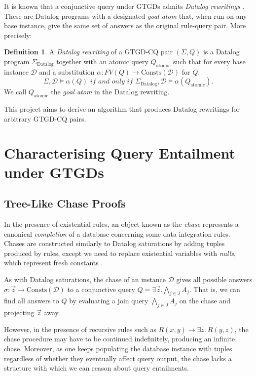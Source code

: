\documentclass[12pt]{report}
\theoremstyle{plain}
\theoremstyle{definition}
\newtheorem{definition}[theorem]{Definition}
\def\Consts{{\mathrm{Consts}}}
\begin{document}
It is known that a conjunctive query under GTGDs admits \emph{Datalog rewritings} \cite{barany_benedikt_cate_2013}. These are Datalog programs with a designated \emph{goal atom} that, when run on any base instance, give the same set of answers as the original rule-query pair. More precisely:

\begin{definition}
  A \emph{Datalog rewriting} of a GTGD-CQ pair $(\Sigma, Q)$ is a Datalog program $\Sigma_\mathrm{Datalog}$ together with an atomic query $Q_\mathrm{atomic}$ such that for every base instance $\mathcal{D}$ and a substitution $\alpha: FV(Q) \rightarrow \Consts(\mathcal{D})$ for $Q$, $$\Sigma, \mathcal{D} \models \alpha(Q) \textit{ if and only if } \Sigma_\mathrm{Datalog}, \mathcal{D} \models \alpha(Q_\mathrm{atomic}).$$
  We call $Q_\mathrm{atomic}$ the \emph{goal atom} in the Datalog rewriting.
\end{definition}

This project aims to derive an algorithm that produces Datalog rewritings for arbitrary GTGD-CQ pairs.

\newpage
\chapter{Characterising Query Entailment under GTGDs}
\label{characterising-query-entailment-under-gtgds}

\section{Tree-Like Chase Proofs}

In the presence of existential rules, an object known as the \emph{chase} represents a canonical \emph{completion} of a database concerning some data integration rules. Chases are constructed similarly to Datalog saturations by adding tuples produced by rules, except we need to replace existential variables with \emph{nulls}, which represent fresh constants \cite{fagin_kolaitis_miller_popa_2005}.

As with Datalog saturations, the chase of an instance $\mathcal{D}$ gives all possible answers $\sigma: \vec{z} \rightarrow \Consts(\mathcal{D})$ to a conjunctive query $Q = \exists \vec{z}. \bigwedge_{j \in J} A_j$. That is, we can find all answers to $Q$ by evaluating a join query $\bigwedge_{j \in J} A_j$ on the chase and projecting $\vec{z}$ away.

However, in the presence of recursive rules such as $R(x, y) \rightarrow \exists z.\ R(y, z)$, the chase procedure may have to be continued indefinitely, producing an infinite chase. Moreover, as one keeps populating the database instance with tuples regardless of whether they eventually affect query output, the chase lacks a structure with which we can reason about query entailments.
\end{document}
